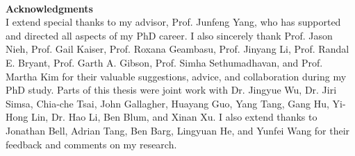 ~\\[1in] %
\textbf{\Huge Acknowledgments}\\

\noindent 
I extend special thanks to my advisor, Prof. Junfeng Yang, who has supported 
and directed all aspects of my PhD career. I also sincerely thank Prof. Jason 
Nieh, Prof. Gail Kaiser, Prof. Roxana Geambasu, Prof. Jinyang Li, Prof. Randal 
E. Bryant, Prof. Garth A. Gibson, Prof. Simha Sethumadhavan, and Prof. Martha 
Kim for their valuable suggestions, advice, and collaboration during my PhD 
study. Parts of this thesis were joint work with Dr. Jingyue Wu, Dr. Jiri 
Simsa, Chia-che Tsai, John Gallagher, Huayang Guo, Yang Tang, Gang Hu, Yi-Hong 
Lin, Dr. Hao Li,  Ben Blum, and Xinan Xu. I also extend thanks to Jonathan 
Bell, Adrian Tang, Ben Barg, Lingyuan He, and Yunfei Wang for their feedback and 
comments on my research.

